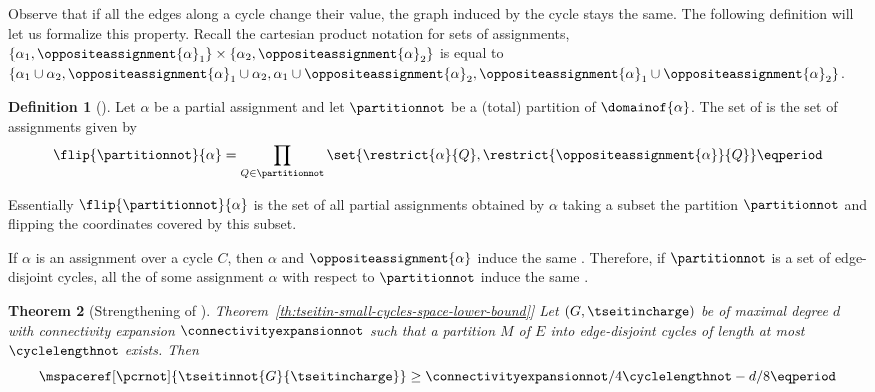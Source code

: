 \documentclass[11pt]{article}
\numberwithin{equation}{section}
\newtheorem{theorem}{Theorem}[section]
\theoremstyle{definition}
\newtheorem{definition}[theorem]{Definition}
\theoremstyle{plain}
\newcommand{\expref}[2]{\hyperref[#2]{#1~\ref{#2}}}
\begin{document}
Observe that if all the edges along a cycle change their value, the
graph induced by the cycle stays the same. The following definition
will let us formalize this property. Recall the cartesian product
notation for sets of assignments, \egComma
%
$\{\alpha_{1}, \oppositeassignment{\alpha}_{1}\}
\times
\{\alpha_{2}, \oppositeassignment{\alpha}_{2}\}$ is equal to
%
$\{\alpha_{1} \cup \alpha_{2}, \oppositeassignment{\alpha}_{1} \cup
\alpha_{2}, \alpha_{1} \cup \oppositeassignment{\alpha}_{2},
\oppositeassignment{\alpha}_{1} \cup \oppositeassignment{\alpha}_{2}
\}$.


\begin{definition}[\Flippedassignments]
  \label{def:flippedassignments}
  Let $\alpha$ be a partial assignment and let $\partitionnot$ be a (total) partition of $\domainof{\alpha}$. The set of  is the set of assignments given by
  \begin{equation*}
    \flip{\partitionnot}{\alpha}=\prod_{Q\in\partitionnot}\set{\restrict{\alpha}{Q},\restrict{\oppositeassignment{\alpha}}{Q}} \eqperiod
  \end{equation*}
\end{definition}

Essentially $\flip{\partitionnot}{\alpha}$ is the set of all partial
assignments obtained by $\alpha$ taking a subset the partition
$\partitionnot$ and flipping the coordinates covered by this subset.

\begin{observation}
  \label{obs:flipping-respects-induced}
  If $\alpha$ is an assignment over a cycle $C$, then $\alpha$ and $\oppositeassignment{\alpha}$ induce the same \chargedgraph. Therefore, if $\partitionnot$ is a set of edge-disjoint cycles, all the \flippedassignments of some assignment $\alpha$ with respect to $\partitionnot$ induce the same \chargedgraph.
\end{observation}


\begin{theorem}[Strengthening of \expref{Theorem}{th:tseitin-small-cycles-space-lower-bound}]
  \label{th:tseitin-small-cycles-space-lower-bound-strengthened}
  Let $(G,\tseitincharge)$ be \Gnonsplitting \chargedgraph of maximal degree $d$ with connectivity expansion $\connectivityexpansionnot$ such that a partition $M$ of $E$ into edge-disjoint cycles of length at most $\cyclelengthnot$ exists. Then
  \begin{equation*}
    \mspaceref[\pcrnot]{\tseitinnot{G}{\tseitincharge}}\geq \connectivityexpansionnot/4\cyclelengthnot -d/8 \eqperiod
  \end{equation*}
\end{theorem}
\end{document}
